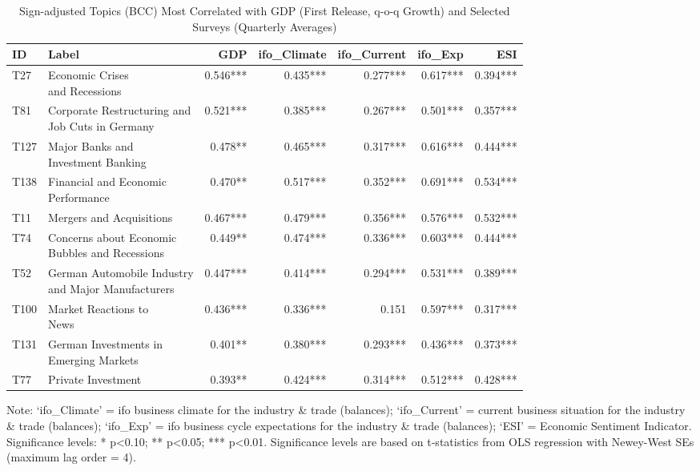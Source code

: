 \begin{table}[h!]
  \centering
  \begin{threeparttable}
    \footnotesize
    \renewcommand{\arraystretch}{1.3}
  \caption{Sign-adjusted Topics (BCC) Most Correlated with GDP (First Release, q-o-q Growth) and Selected Surveys (Quarterly Averages)}
  \label{tab:cor_gdp_topics_bcc_2009_200_all_quarterly}


\begin{tabular}{llrrrrr}
\hline
ID & Label & GDP & ifo\_Climate & ifo\_Current & ifo\_Exp & ESI\\
\hline
T27 & \makecell[tl]{ Economic Crises \\ and Recessions} & 0.546*** & 0.435*** & 0.277*** & 0.617*** & 0.394***\\
T81 & \makecell[tl]{ Corporate Restructuring and \\ Job Cuts in Germany} & 0.521*** & 0.385*** & 0.267*** & 0.501*** & 0.357***\\
T127 & \makecell[tl]{ Major Banks and \\ Investment Banking} & 0.478** & 0.465*** & 0.317*** & 0.616*** & 0.444***\\
T138 & \makecell[tl]{ Financial and Economic \\ Performance} & 0.470** & 0.517*** & 0.352*** & 0.691*** & 0.534***\\
T11 & Mergers and Acquisitions & 0.467*** & 0.479*** & 0.356*** & 0.576*** & 0.532***\\
\addlinespace
T74 & \makecell[tl]{ Concerns about Economic\\ Bubbles and Recessions} & 0.449** & 0.474*** & 0.336*** & 0.603*** & 0.444***\\
T52 & \makecell[tl]{ German Automobile Industry \\ and Major Manufacturers} & 0.447*** & 0.414*** & 0.294*** & 0.531*** & 0.389***\\
T100 & \makecell[tl]{ Market Reactions to \\News} & 0.436*** & 0.336*** & 0.151 & 0.597*** & 0.317***\\
T131 & \makecell[tl]{German Investments in \\ Emerging Markets} & 0.401** & 0.380*** & 0.293*** & 0.436*** & 0.373***\\
T77 & Private Investment & 0.393** & 0.424*** & 0.314*** & 0.512*** & 0.428***\\
\hline
\end{tabular}

    \begin{tablenotes}[flushleft]
      \small \item Note: ‘ifo\_Climate’ = ifo business climate for the industry \& trade (balances); ‘ifo\_Current’ = current business situation for the industry \& trade (balances); ‘ifo\_Exp’ = ifo business cycle expectations for the industry \& trade (balances); ‘ESI’ = Economic Sentiment Indicator. Significance levels: * p<0.10; ** p<0.05; *** p<0.01. Significance levels are based on t-statistics from OLS regression with Newey-West SEs (maximum lag order = 4).
    \end{tablenotes}
  \end{threeparttable}
\end{table}

